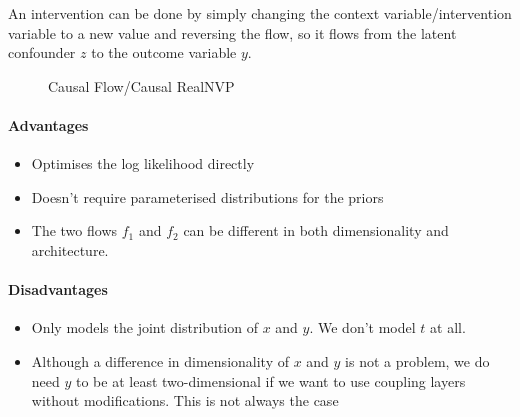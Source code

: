 \documentclass{article}
\begin{document}
An intervention can be done by simply changing the context variable/intervention variable to a new value and reversing the flow, so it flows from the latent confounder $z$ to the outcome variable $y$.

\begin{figure}
    \centering
    
    \caption{Causal Flow/Causal RealNVP}
    \label{fig:two_headed_causal_flow}
\end{figure}

\paragraph{Advantages}
\begin{itemize}
    \item Optimises the log likelihood directly
    \item Doesn't require parameterised distributions for the priors
    \item The two flows $f_1$ and $f_2$ can be different in both dimensionality and architecture.
\end{itemize}

\paragraph{Disadvantages}
\begin{itemize}
    \item Only models the joint distribution of $x$ and $y$. We don't model $t$ at all.
    \item Although a difference in dimensionality of $x$ and $y$ is not a problem, we do need $y$ to be at least two-dimensional if we want to use coupling layers without modifications. This is not always the case
\end{itemize} 
\end{document}
